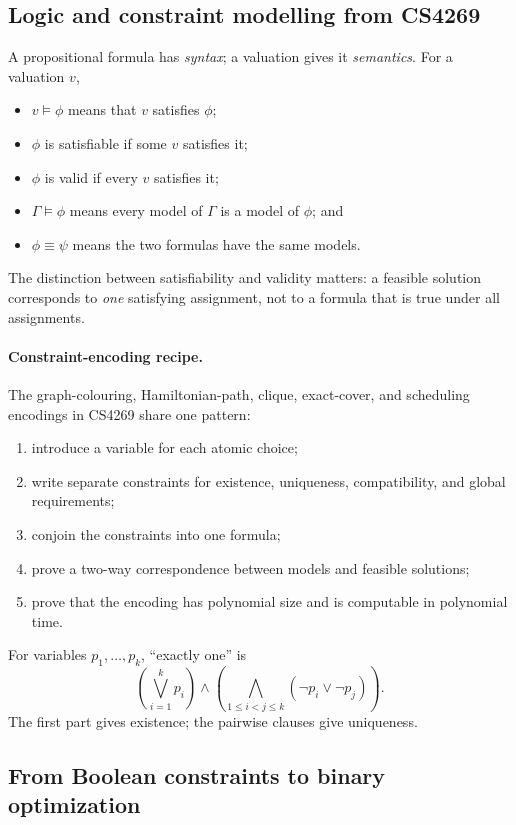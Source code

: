 \documentclass[10pt]{article}
\theoremstyle{definition}
\begin{document}
\subsection{Logic and constraint modelling from CS4269}

A propositional formula has \emph{syntax}; a valuation gives it
\emph{semantics}.  For a valuation $v$,
\begin{itemize}
  \item $v\models\phi$ means that $v$ satisfies $\phi$;
  \item $\phi$ is satisfiable if some $v$ satisfies it;
  \item $\phi$ is valid if every $v$ satisfies it;
  \item $\Gamma\models\phi$ means every model of $\Gamma$ is a model of
        $\phi$; and
  \item $\phi\equiv\psi$ means the two formulas have the same models.
\end{itemize}
The distinction between satisfiability and validity matters: a feasible
solution corresponds to \emph{one} satisfying assignment, not to a formula
that is true under all assignments.

\paragraph{Constraint-encoding recipe.}
The graph-colouring, Hamiltonian-path, clique, exact-cover, and scheduling
encodings in CS4269 share one pattern:
\begin{enumerate}
  \item introduce a variable for each atomic choice;
  \item write separate constraints for existence, uniqueness, compatibility,
        and global requirements;
  \item conjoin the constraints into one formula;
  \item prove a two-way correspondence between models and feasible solutions;
  \item prove that the encoding has polynomial size and is computable in
        polynomial time.
\end{enumerate}
For variables $p_1,\ldots,p_k$, ``exactly one'' is
\[
  \left(\bigvee_{i=1}^k p_i\right)
  \land
  \left(\bigwedge_{1\le i<j\le k}(\neg p_i\lor\neg p_j)\right).
\]
The first part gives existence; the pairwise clauses give uniqueness.

\subsection{From Boolean constraints to binary optimization}
\end{document}
